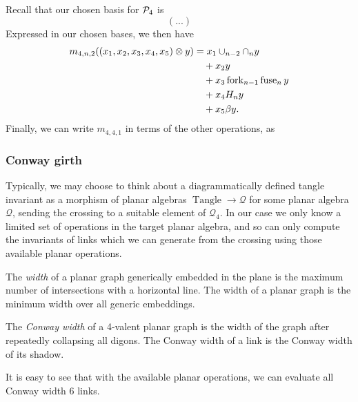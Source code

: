 \documentclass[12pt]{amsart}
\begin{document}
Recall that our chosen basis for $\mathcal{P}_4$ is
\[
  \left(
    ...
  \right)
\]
Expressed in our chosen bases, we then have 
\begin{align*}
  m_{4,n,2}((x_1, x_2, x_3, x_4, x_5) \otimes y)
    & = x_1 \cup_{n-2}\cap_n y \\
      & \quad + x_2 y \\
      & \quad + x_3 \operatorname{fork}_{n-1}\operatorname{fuse}_n y \\
      & \quad + x_4 H_n y \\
      & \quad + x_5 \beta y.
\end{align*}
Finally, we can write $m_{4,4,1}$ in terms of the other operations, as 

\subsubsection{Conway girth}
Typically, we may choose to think about a diagrammatically defined tangle 
invariant as a morphism of planar algebras 
$\operatorname{Tangle} \to \mathcal{Q}$ for some planar algebra
$\mathcal{Q}$, sending the crossing to a suitable element of $\mathcal{Q}_4$.
In our case we only know a limited set of operations in the target planar
algebra, and so can only compute the invariants of links which we can generate
from the crossing using those available planar operations.

\begin{definition}
The \emph{width} of a planar graph generically embedded in the plane is the 
maximum number of intersections with a horizontal line. The width of a planar
graph is the minimum width over all generic embeddings.

The \emph{Conway width} of a 4-valent planar graph is the width of the graph 
after repeatedly collapsing all digons. The Conway width of a link is the
Conway width of its shadow.
\end{definition}

It is easy to see that with the available planar operations, we can evaluate 
all Conway width 6 links.
\end{document}
